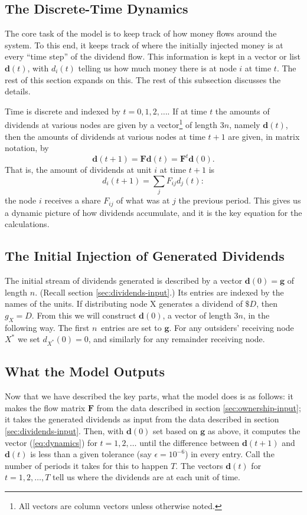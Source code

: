 \documentclass[a4paper,12pt,reqno]{amsart}
\theoremstyle{definition} \newtheorem{example}{Example}
\theoremstyle{definition} \newtheorem{condition}{Condition}
\theoremstyle{definition} \newtheorem{corollary}{Corollary}
\theoremstyle{definition} \newtheorem{claim}{Claim}
\theoremstyle{definition} \newtheorem{definition}{Definition}
\theoremstyle{definition} \newtheorem{conjecture}{Conjecture}
\theoremstyle{definition} \newtheorem{lemma}{Lemma}
\theoremstyle{definition} \newtheorem{theorem}{Theorem}
\theoremstyle{definition} \newtheorem*{theoremNoNumber}{Theorem}
\theoremstyle{definition} \newtheorem*{lemmaCorrespondence}{Lemma \ref{lem:correspondence}}
\theoremstyle{definition}\newtheorem{proposition}{Proposition}
\theoremstyle{definition} \newtheorem{result}{Result}
\theoremstyle{definition} \newtheorem*{definitionNoNumber}{Definition}
\theoremstyle{definition} \newtheorem{assumption}{Assumption}
\theoremstyle{definition} \newtheorem*{assumptionNoNumber}{Assumption}
\theoremstyle{definition} \newtheorem*{fact}{Fact}
\theoremstyle{definition} \newtheorem*{property}{Property}
\theoremstyle{definition} \newtheorem{remark}{Remark}
\newcommand{\be}{\begin{equation}}
\newcommand{\ee}{\end{equation}}
\begin{document}
\subsection{The Discrete-Time Dynamics} The core task of the model is to keep track of how money flows around the system. To this end, it keeps track of where the initially injected money is at every ``time step'' of the dividend flow. This information is kept in a vector or list $\mathbf{d}(t)$, with $d_i(t)$ telling us how much money there is at node $i$ at time $t$. The rest of this section expands on this. The rest of this subsection discusses the details.

Time is discrete and indexed by $t=0,1,2,\ldots$. If at time $t$ the amounts of dividends at various nodes are given by a vector\footnote{All vectors are column vectors unless otherwise noted.} of length $3n$, namely $\mathbf{d}(t)$, then the amounts of dividends at various nodes at time $t+1$ are given, in matrix notation, by \be \label{eq:dynamics} \mathbf{d}(t+1) = \mathbf{F} \mathbf{d}(t)=\mathbf{F}^t \mathbf{d}(0).\ee That is, the amount of dividends at unit $i$ at time $t+1$ is $$d_i(t+1) = \sum_{j} F_{ij} d_j(t):$$ the node $i$ receives a share $F_{ij}$ of what was at $j$ the previous period. This gives us a dynamic picture of how dividends accumulate, and it is the key equation for the calculations.

\subsection{The Initial Injection of Generated Dividends} The initial stream of dividends generated is described by a vector $\mathbf{d}(0)=\mathbf{g}$ of length $n$. (Recall section  \ref{sec:dividends-input}.) Its entries are indexed by the names of the units.  If distributing node X generates a dividend of $ \$D $, then $g_X=D$. From this we will construct $\mathbf{d}(0)$, a vector of length $3n$, in the following way. The first $n$\ entries are set to $\mathbf{g}$. For any outsiders' receiving node $X^*$ we set $d_{X^*}(0)=0$, and similarly for any remainder receiving node.

\subsection{What the Model Outputs} Now that we have described the key  parts, what the model does is as follows: it makes the flow matrix $\mathbf{F}$ from the data described in section \ref{sec:ownership-input}; it takes the generated dividends as input from the data described in section \ref{sec:dividends-input}. Then, with $\mathbf{d}(0)$ set based on $\mathbf{g}$ as above, it computes the vector (\ref{eq:dynamics}) for $t=1,2,\ldots$ until the difference between $\mathbf{d}(t+1)$ and $\mathbf{d}(t)$ is less than a given tolerance (say $\epsilon=10^{-6}$) in every entry. Call the number of periods it takes for this to happen $T$. The vectors $\mathbf{d}(t)$ for $t=1,2,\ldots,T$ tell us where the dividends are at each unit of time.
\end{document}
